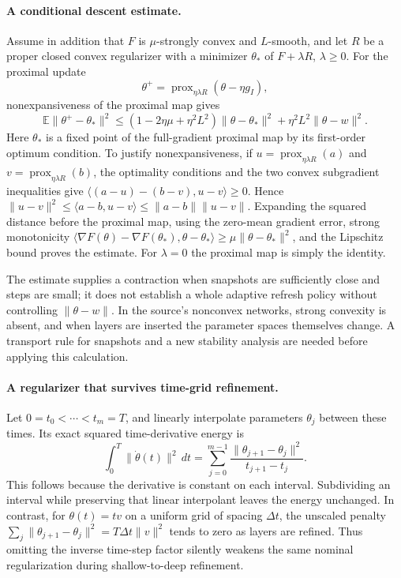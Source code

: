 \documentclass[11pt]{article}
\begin{document}
\paragraph{A conditional descent estimate.}
Assume in addition that $F$ is $\mu$-strongly convex and $L$-smooth, and let $R$ be a proper closed convex regularizer with a minimizer $\theta_*$ of $F+\lambda R$, $\lambda\ge0$. For the proximal update
\[
 \theta^+=\operatorname{prox}_{\eta\lambda R}(\theta-\eta g_I),
\]
nonexpansiveness of the proximal map gives
\[
 \mathbb E\|\theta^+-\theta_*\|^2
 \le(1-2\eta\mu+\eta^2L^2)\|\theta-\theta_*\|^2
       +\eta^2L^2\|\theta-w\|^2.
\]
Here $\theta_*$ is a fixed point of the full-gradient proximal map by its first-order optimum condition. To justify nonexpansiveness, if $u=\operatorname{prox}_{\eta\lambda R}(a)$ and $v=\operatorname{prox}_{\eta\lambda R}(b)$, the optimality conditions and the two convex subgradient inequalities give $\langle (a-u)-(b-v),u-v\rangle\ge0$. Hence $\|u-v\|^2\le\langle a-b,u-v\rangle\le\|a-b\|\|u-v\|$. Expanding the squared distance before the proximal map, using the zero-mean gradient error, strong monotonicity $\langle\nabla F(\theta)-\nabla F(\theta_*),\theta-\theta_*\rangle\ge\mu\|\theta-\theta_*\|^2$, and the Lipschitz bound proves the estimate. For $\lambda=0$ the proximal map is simply the identity.

The estimate supplies a contraction when snapshots are sufficiently close and steps are small; it does not establish a whole adaptive refresh policy without controlling $\|\theta-w\|$. In the source's nonconvex networks, strong convexity is absent, and when layers are inserted the parameter spaces themselves change. A transport rule for snapshots and a new stability analysis are needed before applying this calculation.

\paragraph{A regularizer that survives time-grid refinement.}
Let $0=t_0<\cdots<t_m=T$, and linearly interpolate parameters $\theta_j$ between these times. Its exact squared time-derivative energy is
\[
 \int_0^T\|\dot\theta(t)\|^2\,dt
 =\sum_{j=0}^{m-1}\frac{\|\theta_{j+1}-\theta_j\|^2}{t_{j+1}-t_j}.
\]
This follows because the derivative is constant on each interval. Subdividing an interval while preserving that linear interpolant leaves the energy unchanged. In contrast, for $\theta(t)=tv$ on a uniform grid of spacing $\Delta t$, the unscaled penalty $\sum_j\|\theta_{j+1}-\theta_j\|^2=T\Delta t\|v\|^2$ tends to zero as layers are refined. Thus omitting the inverse time-step factor silently weakens the same nominal regularization during shallow-to-deep refinement.
\end{document}
